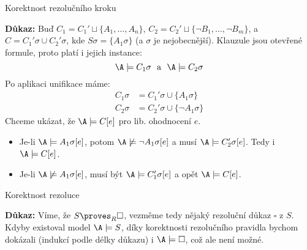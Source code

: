 \documentclass{beamer}
\begin{document}
\begin{frame}{Korektnost rezolučního kroku}

    \pause

    \pause
    \textbf{Důkaz:} Buď $C_1=C_1'\sqcup \{A_1,\dots,A_n\}$, $C_2=C_2'\sqcup \{\neg B_1,\dots,\neg B_m\}$, a $C=C_1'\sigma \cup C_2'\sigma$, kde $S\sigma=\{A_1\sigma\}$ (a $\sigma$ je
    nejobecnější). \pause Klauzule jsou otevřené formule, proto platí i jejich instance:     
    $$
    \A\models C_1\sigma\ \text{ a }\ \A\models C_2\sigma
    $$     
    \pause Po aplikaci unifikace máme: \pause
    \begin{align*}        
        C_1\sigma&=C_1'\sigma \cup \{A_1\sigma\} \\ 
        C_2\sigma&=C_2'\sigma \cup \{\neg A_1\sigma\}      
    \end{align*}
    \pause Chceme ukázat, že $\A\models C[e]$ pro lib. ohodnocení $e$.
    \begin{itemize}
        \item \pause Je-li \alert{$\A\models A_1\sigma[e]$}, potom $\A\not\models\neg A_1\sigma[e]$ a musí \alert{$\A\models C_2'\sigma[e]$}. Tedy i $\A\models C[e]$. \pause
        \item Je-li \alert{$\A\not\models A_1\sigma[e]$}, musí být \alert{$\A\models C_1'\sigma[e]$} a opět $\A\models C[e]$. \hfill\qedsymbol
    \end{itemize}    

\end{frame}


\begin{frame}{Korektnost rezoluce}

    \pause

    \medskip

    \pause
    \textbf{Důkaz:}
        Víme, že $S\proves_R\square$, vezměme tedy nějaký rezoluční důkaz $\square$ z $S$. \pause Kdyby existoval model $\A\models S$, díky korektnosti rezolučního pravidla bychom dokázali (indukcí podle délky důkazu) i $\A\models\square$, \pause což ale není možné. \hfill\qedsymbol

\end{frame}
\end{document}
